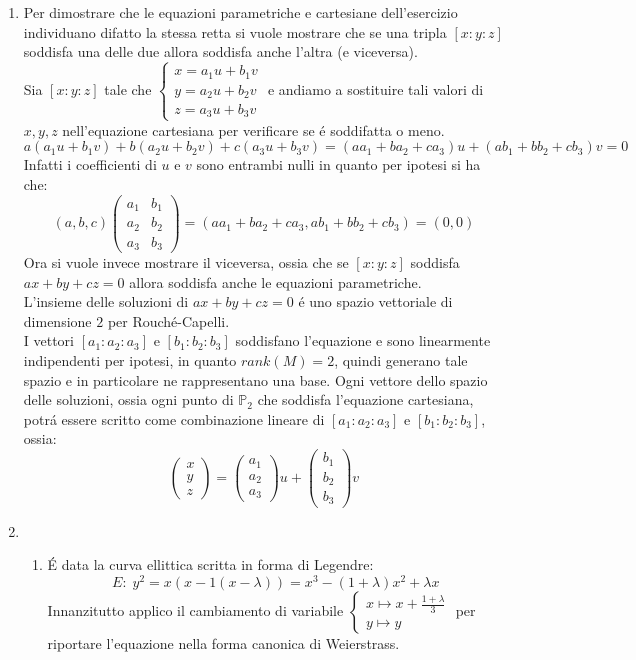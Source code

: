\documentclass[a4paper]{article}
\newcommand{\bm}{ \begin{pmatrix} }
\newcommand{\edm}{ \end{pmatrix} }
\newcommand{\sist}{\begin{cases}}
\newcommand{\esist}{\end{cases}}
\newcommand{\ds}{\displaystyle}
\begin{document}
\begin{enumerate}
\item Per dimostrare che le equazioni parametriche e cartesiane dell'esercizio individuano difatto la stessa retta si vuole mostrare che se una tripla $[x:y:z]$ soddisfa una delle due allora soddisfa anche l'altra (e viceversa).\\
Sia $[x:y:z]$ tale che 
$
\sist
x= a_1 u + b_1v \\
y=a_2u+b_2v\\
z=a_3u+b_3v
\esist
$
e andiamo a sostituire tali valori di $x,y,z$ nell'equazione cartesiana per verificare se \'e soddifatta o meno.\\
$$a(a_1u+b_1v)+b(a_2u+b_2v)+c(a_3u+b_3v)=( a a_1+b a_2+c a_3)u +( a b_1+b b_2+c b_3)v=0$$
Infatti i coefficienti di $u$ e $v$ sono entrambi nulli in quanto per ipotesi si ha che:
$$(a,b,c)\bm a_1 & b_1\\ a_2 & b_2\\ a_3 & b_3 \edm = (a a_1+b a_2+c a_3,a b_1+b b_2+c b_3)=(0,0)$$ 
Ora si vuole invece mostrare il viceversa, ossia che se $[x:y:z]$ soddisfa $ax+by+cz=0$ allora soddisfa anche le equazioni parametriche.\\
L'insieme delle soluzioni di $ax+by+cz=0$ \'e uno spazio vettoriale di dimensione $2$ per Rouch\'e-Capelli.\\
I vettori $[a_1:a_2:a_3]$ e $[b_1:b_2:b_3]$ soddisfano l'equazione e sono linearmente indipendenti per ipotesi, in quanto $rank(M)=2$, quindi generano tale spazio e in particolare ne rappresentano una base. Ogni vettore dello spazio delle soluzioni, ossia ogni punto di $\mathbb{P}_2$ che soddisfa l'equazione cartesiana, potr\'a essere scritto come combinazione lineare di $[a_1:a_2:a_3]$ e $[b_1:b_2:b_3]$, ossia:
$$
\bm x \\ y \\ z \edm = \bm a_1 \\ a_2 \\ a_3 \edm u + \bm b_1 \\ b_2 \\b_3 \edm v
$$



\item 
\begin{enumerate}
\item 
\'E data la curva ellittica scritta in forma di Legendre:
$$E:\;y^2=x(x-1(x-\lambda))=x^3-(1+\lambda)x^2+\lambda x$$
Innanzitutto applico il cambiamento di variabile 
$\sist 
x \longmapsto \ds{x+\frac{1+\lambda}{3}} \\
y \longmapsto y
\esist$
per riportare l'equazione nella forma canonica di Weierstrass.


\end{enumerate}
\end{enumerate}
\end{document}
